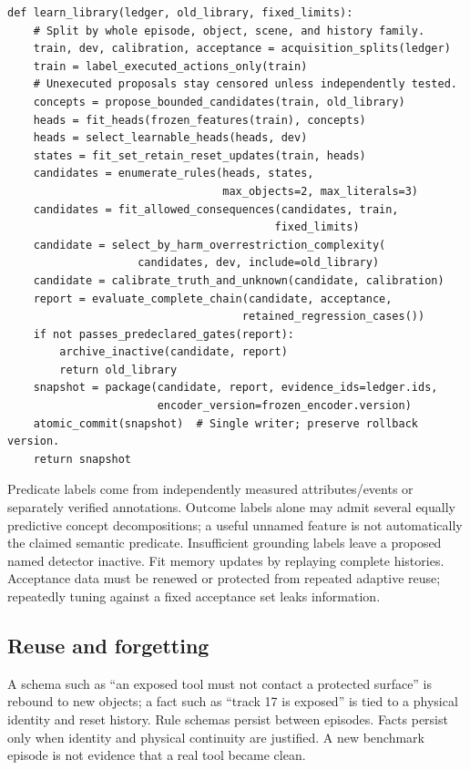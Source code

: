 \documentclass[10pt]{article}
\begin{document}
\begin{lstlisting}[caption={Algorithm 1. Offline learning and persistent reuse},basicstyle=\ttfamily\footnotesize]
def learn_library(ledger, old_library, fixed_limits):
    # Split by whole episode, object, scene, and history family.
    train, dev, calibration, acceptance = acquisition_splits(ledger)
    train = label_executed_actions_only(train)
    # Unexecuted proposals stay censored unless independently tested.
    concepts = propose_bounded_candidates(train, old_library)
    heads = fit_heads(frozen_features(train), concepts)
    heads = select_learnable_heads(heads, dev)
    states = fit_set_retain_reset_updates(train, heads)
    candidates = enumerate_rules(heads, states,
                                 max_objects=2, max_literals=3)
    candidates = fit_allowed_consequences(candidates, train,
                                         fixed_limits)
    candidate = select_by_harm_overrestriction_complexity(
                    candidates, dev, include=old_library)
    candidate = calibrate_truth_and_unknown(candidate, calibration)
    report = evaluate_complete_chain(candidate, acceptance,
                                    retained_regression_cases())
    if not passes_predeclared_gates(report):
        archive_inactive(candidate, report)
        return old_library
    snapshot = package(candidate, report, evidence_ids=ledger.ids,
                       encoder_version=frozen_encoder.version)
    atomic_commit(snapshot)  # Single writer; preserve rollback version.
    return snapshot
\end{lstlisting}

Predicate labels come from independently measured attributes/events or separately verified annotations. Outcome labels alone may admit several equally predictive concept decompositions; a useful unnamed feature is not automatically the claimed semantic predicate. Insufficient grounding labels leave a proposed named detector inactive. Fit memory updates by replaying complete histories. Acceptance data must be renewed or protected from repeated adaptive reuse; repeatedly tuning against a fixed acceptance set leaks information.

\subsection{Reuse and forgetting}
A schema such as ``an exposed tool must not contact a protected surface'' is rebound to new objects; a fact such as ``track 17 is exposed'' is tied to a physical identity and reset history. Rule schemas persist between episodes. Facts persist only when identity and physical continuity are justified. A new benchmark episode is not evidence that a real tool became clean.
\end{document}
